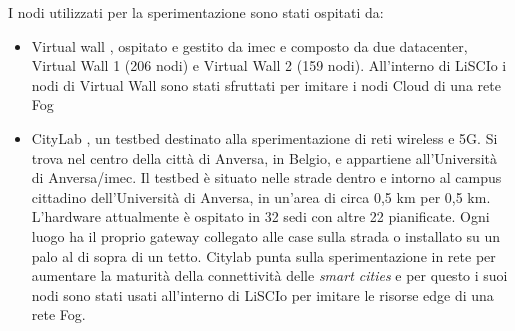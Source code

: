     
    I nodi utilizzati per la sperimentazione sono stati ospitati da:
    \begin{itemize}
        \item Virtual wall \cite {vw}, ospitato e gestito da imec e composto da due datacenter, Virtual Wall 1 (206 nodi) e Virtual Wall 2 (159 nodi). All'interno di LiSCIo i nodi di Virtual Wall sono stati sfruttati per imitare i nodi Cloud di una rete Fog
        \item CityLab \cite {cl}, un testbed destinato alla sperimentazione di reti wireless e 5G. Si trova nel centro della città di Anversa, in Belgio, e appartiene all'Università di Anversa/imec. Il testbed è situato nelle strade dentro e intorno al campus cittadino dell'Università di Anversa, in un'area di circa 0,5 km per 0,5 km. L'hardware attualmente è ospitato in 32 sedi con altre 22 pianificate. Ogni luogo ha il proprio gateway collegato alle case sulla strada o installato su un palo al di sopra di un tetto. Citylab punta sulla sperimentazione in rete per aumentare la maturità della connettività delle \emph{smart cities} \cite {clpdf} e per questo i suoi nodi sono stati usati all'interno di LiSCIo per imitare le risorse edge di una rete Fog.
    \end{itemize}